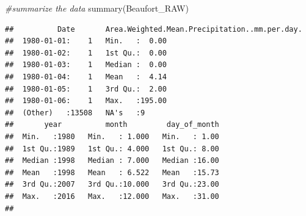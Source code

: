\documentclass[
  12pt,
]{article}
\newenvironment{Shaded}{\begin{snugshade}}{\end{snugshade}}
\newcommand{\AttributeTok}[1]{\textcolor[rgb]{0.77,0.63,0.00}{#1}}
\newcommand{\CommentTok}[1]{\textcolor[rgb]{0.56,0.35,0.01}{\textit{#1}}}
\newcommand{\ConstantTok}[1]{\textcolor[rgb]{0.00,0.00,0.00}{#1}}
\newcommand{\DecValTok}[1]{\textcolor[rgb]{0.00,0.00,0.81}{#1}}
\newcommand{\FunctionTok}[1]{\textcolor[rgb]{0.00,0.00,0.00}{#1}}
\newcommand{\NormalTok}[1]{#1}
\newcommand{\OtherTok}[1]{\textcolor[rgb]{0.56,0.35,0.01}{#1}}
\newcommand{\SpecialCharTok}[1]{\textcolor[rgb]{0.00,0.00,0.00}{#1}}
\newcommand{\StringTok}[1]{\textcolor[rgb]{0.31,0.60,0.02}{#1}}
\begin{document}
\begin{Shaded}
\begin{Highlighting}[]
\CommentTok{\#summarize the data}
\FunctionTok{summary}\NormalTok{(Beaufort\_RAW)}
\end{Highlighting}
\end{Shaded}

\begin{verbatim}
##          Date       Area.Weighted.Mean.Precipitation..mm.per.day.
##  1980-01-01:    1   Min.   :  0.00                               
##  1980-01-02:    1   1st Qu.:  0.00                               
##  1980-01-03:    1   Median :  0.00                               
##  1980-01-04:    1   Mean   :  4.14                               
##  1980-01-05:    1   3rd Qu.:  2.00                               
##  1980-01-06:    1   Max.   :195.00                               
##  (Other)   :13508   NA's   :9                                    
##       year          month         day_of_month  
##  Min.   :1980   Min.   : 1.000   Min.   : 1.00  
##  1st Qu.:1989   1st Qu.: 4.000   1st Qu.: 8.00  
##  Median :1998   Median : 7.000   Median :16.00  
##  Mean   :1998   Mean   : 6.522   Mean   :15.73  
##  3rd Qu.:2007   3rd Qu.:10.000   3rd Qu.:23.00  
##  Max.   :2016   Max.   :12.000   Max.   :31.00  
## 
\end{verbatim}

\begin{Shaded}
\end{Shaded}
\end{document}

